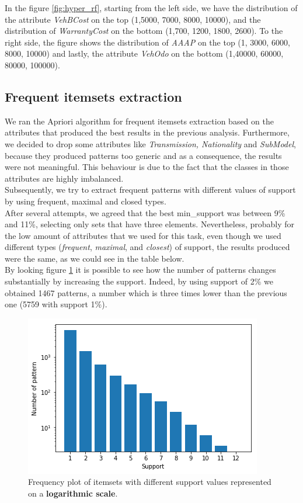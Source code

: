 \documentclass{article}
\begin{document}
	In the figure \ref{fig:hyper_rf}, starting from the left side, we have the distribution of the attribute \emph{VehBCost} on the top (1,5000, 7000, 8000, 10000), and the distribution of \emph{WarrantyCost} on the bottom (1,700, 1200, 1800, 2600). 
	To the right side, the figure shows the distribution of \emph{AAAP} on the top (1, 3000, 6000, 8000, 10000) and lastly, the attribute \emph{VehOdo} on the bottom (1,40000, 60000, 80000, 100000). 
	
	\subsection{Frequent itemsets extraction}
	
	We ran the Apriori algorithm for frequent itemsets extraction based on the attributes that produced the best results in the previous analysis. Furthermore, we decided to drop some attributes like \emph{Transmission, Nationality} and \emph{SubModel}, because they produced patterns too generic and as a consequence, the results were not meaningful. This behaviour is due to the fact that the classes in those attributes are highly imbalanced.\\
	Subsequently, we try to extract frequent patterns with different values of support by using frequent, maximal and closed types.\\
	After several attempts, we agreed that the best min\_support was between 9\% and 11\%, selecting only sets that have three elements. Nevertheless, probably for the low amount of attributes that we used for this task, even though we used different types (\emph{frequent}, \emph{maximal}, and \emph{closest}) of support, the results produced were the same, as we could see in the table below.\\
	By looking figure \ref{fig:hyper_rf_us} it is possible to see how the number of patterns changes substantially by increasing the support. Indeed, by using support of 2\%  we obtained 1467 patterns, a number which is three times lower than the previous one (5759 with support 1\%).\\
	
	
	\begin{figure}[H]
		\centering
		\includegraphics[width=.4\textwidth]{support.png}
		\caption{Frequency plot of itemsets with different support values represented on a \textbf{logarithmic scale}.}
		\label{fig:hyper_rf_us}
	\end{figure}
	
\end{document}
